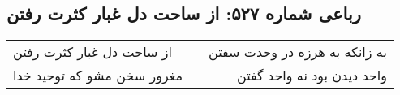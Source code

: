 \begin{center}
\section*{رباعی شماره ۵۲۷: از ساحت دل غبار کثرت رفتن}
\label{sec:sh527}
\begin{longtable}{l p{0.5cm} r}
از ساحت دل غبار کثرت رفتن
&&
به زانکه به هرزه در وحدت سفتن
\\
مغرور سخن مشو که توحید خدا
&&
واحد دیدن بود نه واحد گفتن
\\
\end{longtable}
\end{center}
